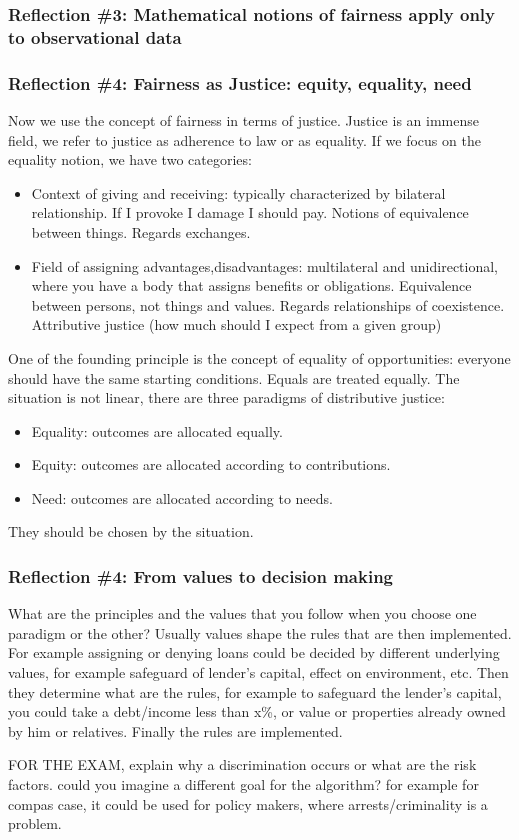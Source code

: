 \subsubsection{Reflection \#3: Mathematical notions of fairness apply only to observational data}
\subsubsection{Reflection \#4: Fairness as Justice: equity, equality, need}
Now we use the concept of fairness in terms of justice. Justice is an immense field, we refer to justice as adherence to law or as equality. If we focus on the equality notion, we have two categories:
\begin{itemize}
    \item Context of giving and receiving: typically characterized by bilateral relationship. If I provoke I damage I should pay. Notions of equivalence between things. Regards exchanges. \item Field of assigning advantages,disadvantages: multilateral and unidirectional, where you have a body that assigns benefits or obligations. Equivalence between persons, not things and values. Regards relationships of coexistence. Attributive justice (how much should I expect from a given group)
\end{itemize}
One of the founding principle is the concept of equality of opportunities: everyone should have the same starting conditions. Equals are treated equally. The situation is not linear, there are three paradigms of distributive justice:
\begin{itemize}
    \item Equality: outcomes are allocated equally.
    \item Equity: outcomes are allocated according to contributions.
    \item Need: outcomes are allocated according to needs.
\end{itemize}
They should be chosen by the situation. 
\subsubsection{Reflection \#4: From values to decision making}
What are the principles and the values that you follow when you choose one paradigm or the other? Usually values shape the rules that are then implemented. For example assigning or denying loans could be decided by different underlying values, for example safeguard of lender's capital, effect on environment, etc. Then they determine what are the rules, for example to safeguard the lender's capital, you could take a debt/income less than x\%, or value or properties already owned by him or relatives. Finally the rules are implemented.

FOR THE EXAM, explain why a discrimination occurs or what are the risk factors. could you imagine a different goal for the algorithm? for example for compas case, it could be used for policy makers, where arrests/criminality is a problem.